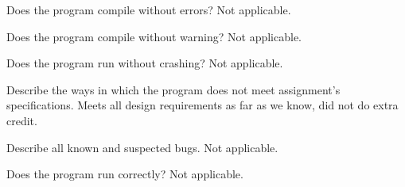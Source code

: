 \documentclass{article}
\begin{document}
\begin{list}{*}{}
\item Does the program compile without errors? Not applicable.
\item Does the program compile without warning? Not applicable.
\item Does the program run without crashing? Not applicable.
\item Describe the ways in which the program does not meet assignment's specifications. Meets all design requirements as far as we know, did not do extra credit.
\item Describe all known and suspected bugs. Not applicable.
\item Does the program run correctly? Not applicable.
\end{list}
\end{document}
